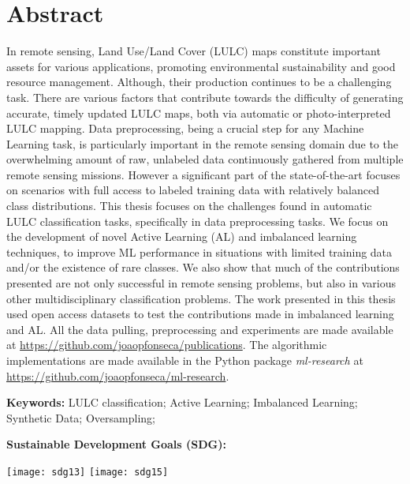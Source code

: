 \chapter*{Abstract}

\begin{adjustwidth}{30pt}{30pt}

    In remote sensing, Land Use/Land Cover (LULC) maps constitute important
    assets for various applications, promoting environmental sustainability
    and good resource management. Although, their production continues to be a
    challenging task.  There are various factors that contribute towards the
    difficulty of generating accurate, timely updated LULC maps, both via
    automatic or photo-interpreted LULC mapping. Data preprocessing, being a
    crucial step for any Machine Learning task, is particularly important in
    the remote sensing domain due to the overwhelming amount of raw, unlabeled
    data continuously gathered from multiple remote sensing missions. However
    a significant part of the state-of-the-art focuses on scenarios with full
    access to labeled training data with relatively balanced class
    distributions. This thesis focuses on the challenges found in automatic
    LULC classification tasks, specifically in data preprocessing tasks.  We
    focus on the development of novel Active Learning (AL) and imbalanced
    learning techniques, to improve ML performance in situations with limited
    training data and/or the existence of rare classes. We also show that much
    of the contributions presented are not only successful in remote sensing
    problems, but also in various other multidisciplinary classification
    problems. The work presented in this thesis used open access datasets to
    test the contributions made in imbalanced learning and AL. All the data
    pulling, preprocessing and experiments are made available at
    \href{https://github.com/joaopfonseca/publications}{https://github.com/joaopfonseca/publications}.
    The algorithmic implementations are made available in the Python package
    \textit{ml-research} at
    \href{https://github.com/joaopfonseca/ml-research}{https://github.com/joaopfonseca/ml-research}.

\end{adjustwidth}

\vspace{.5cm}
\textbf{Keywords:} LULC classification; Active Learning;
Imbalanced Learning; Synthetic Data; Oversampling; 

\vspace{.5cm}
\textbf{Sustainable Development Goals (SDG):} 

\texttt{[image: sdg13]}
\texttt{[image: sdg15]}
